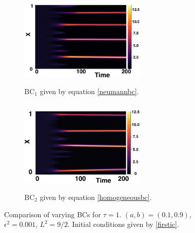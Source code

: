 \begin{figure}[H]
    \centering
    \begin{subfigure}[t]{0.45\textwidth}
        \centering
        \includegraphics[width=6cm,height=4.5cm]{ic21.png}
        \caption{$\text{BC}_1$ given by equation \eqref{neumannbc}.}
        \label{}
    \end{subfigure}
    \hfill
    \begin{subfigure}[t]{0.45\textwidth}
        \centering
        \includegraphics[width=6cm,height=4.5cm]{bc1.png}
        \caption{$\text{BC}_2$ given by equation \eqref{homogeneousbc}.}
        \label{}
    \end{subfigure}
    \caption{Comparison of varying BCs for $\tau=1$. $(a,b)=(0.1,0.9)$, $\epsilon^2=0.001$, $L^2=9/2$. Initial conditions given by \eqref{firstic}.}
    \label{fig:bctau2}
\end{figure}

